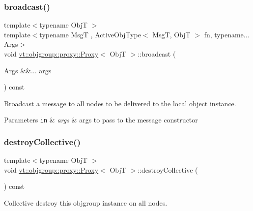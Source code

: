 \subsubsection{\texorpdfstring{broadcast()}{broadcast()}\hspace{0.1cm}{\footnotesize\ttfamily [3/3]}}
{\footnotesize\ttfamily template$<$typename ObjT $>$ \\
template$<$typename MsgT , Active\+Obj\+Type$<$ Msg\+T, Obj\+T $>$ fn, typename... Args$>$ \\
void \hyperlink{structvt_1_1objgroup_1_1proxy_1_1_proxy}{vt\+::objgroup\+::proxy\+::\+Proxy}$<$ ObjT $>$\+::broadcast (\begin{DoxyParamCaption}\item[{Args \&\&...}]{args }\end{DoxyParamCaption}) const}



Broadcast a message to all nodes to be delivered to the local object instance. 


\begin{DoxyParams}[1]{Parameters}
\mbox{\tt in}  & {\em args} & args to pass to the message constructor \\
\hline
\end{DoxyParams}
\mbox{\label{structvt_1_1objgroup_1_1proxy_1_1_proxy_a6758c7979d1f69722449cb78f998cbf1}} 
\subsubsection{\texorpdfstring{destroy\+Collective()}{destroyCollective()}}
{\footnotesize\ttfamily template$<$typename ObjT $>$ \\
void \hyperlink{structvt_1_1objgroup_1_1proxy_1_1_proxy}{vt\+::objgroup\+::proxy\+::\+Proxy}$<$ ObjT $>$\+::destroy\+Collective (\begin{DoxyParamCaption}{ }\end{DoxyParamCaption}) const}



Collective destroy this objgroup instance on all nodes. 

\mbox{\label{structvt_1_1objgroup_1_1proxy_1_1_proxy_a7510598b2915dec55b90bf9ae61c7df9}} 

